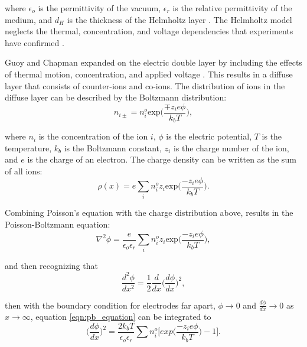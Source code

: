 \noindent where $\epsilon_o$ is the permittivity of the vacuum, $\epsilon_r$ is the relative permittivity of the medium, and $d_H$ is the thickness of the Helmholtz layer \cite{_gongadze.pdf_????}. The Helmholtz model neglects the thermal, concentration, and voltage dependencies that experiments have confirmed \cite{_jes2011.pdf_????}.

\par Guoy and Chapman expanded on the electric double layer by including the effects of thermal motion, concentration, and applied voltage \cite{chapman_li._1913,_gongadze.pdf_????}. This results in a diffuse layer that consists of counter-ions and co-ions. The distribution of ions in the diffuse layer can be described by the Boltzmann distribution:
\begin{equation}
    n_{i\pm} = n_i^o \text{exp}\Big(\frac{ \mp z_i e\phi}{k_b T}\Big),
\end{equation}

\noindent where $n_i$ is the concentration of the ion $i$, $\phi$ is the electric potential, $T$ is the temperature, $k_b$ is the Boltzmann constant, $z_i$ is the charge number of the ion, and $e$ is the charge of an electron. The charge density can be written as the sum of all ions:
\begin{equation}
    \rho(x) = e \sum_i n_i^o z_i \text{exp}\Big(\frac{-z_i e\phi}{k_b T}\Big).
\end{equation}

\par Combining Poisson's equation with the charge distribution above, results in the Poisson-Boltzmann equation:
\begin{equation}
    \nabla^2\phi = \frac{e}{\epsilon_o\epsilon_r} \sum_i n_i^o z_i \text{exp}\Big(\frac{-z_i e \phi}{k_b T}\Big),
    \label{eqn:pb_equation}
\end{equation}

\noindent and then recognizing that
\begin{equation}
    \frac{d^2\phi}{dx^2} = \frac{1}{2}\frac{d}{dx}\Big(\frac{d\phi}{dx}\Big)^2,
\end{equation}

\noindent then with the boundary condition for electrodes far apart, $\phi\to0$ and $\frac{d\phi}{dx}\to 0$ as $x\to\infty$, equation \ref{eqn:pb_equation} can be integrated to
\begin{equation}
    \Big(\frac{d\phi}{dx}\Big)^2 = \frac{2k_b T}{\epsilon_o\epsilon_r} \sum n_i^o \bigg[exp\Big(\frac{-z_i e\phi}{k_b T}\Big) - 1\bigg].
\end{equation}

